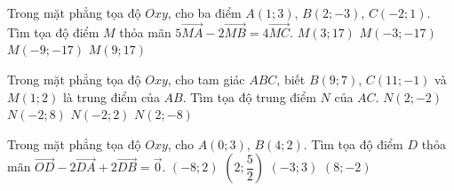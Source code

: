 \begin{ex}%
	Trong mặt phẳng tọa độ $Oxy$, cho ba điểm $A(1;3)$, $B(2;-3)$, $C(-2;1)$. Tìm tọa độ điểm $M$ thỏa mãn $ 5\overrightarrow{MA}-2\overrightarrow{MB}=4\overrightarrow{MC}$.
	\choice
	{$M(3;17)$}
	{$M(-3;-17)$}
	{\True $ M(-9;-17)$}
	{$M(9;17) $}
\end{ex}
\begin{ex}%
	Trong mặt phẳng tọa độ $Oxy$, cho tam giác $ABC$, biết $B(9;7)$, $C(11;-1)$ và $M(1;2)$ là trung điểm của $AB$. Tìm tọa độ trung điểm $N$ của $AC$.
	\choice
	{\True $N(2;-2)$}
	{$N(-2;8)$}
	{$N(-2;2)$}
	{$N(2;-8)$}
\end{ex}
\begin{ex}%
	Trong mặt phẳng tọa độ $O x y$, cho $A (0; 3)$, $B (4; 2)$. Tìm tọa độ điểm $D$ thỏa mãn $\overrightarrow{OD} - 2 \overrightarrow{DA} + 2 \overrightarrow{DB} = \overrightarrow{0}$.
	\choice
	{\True $(-8; 2)$}
	{$\left(2; \dfrac{5}{2} \right)$}
	{$(-3; 3)$}
	{$(8; -2)$}
\end{ex}
